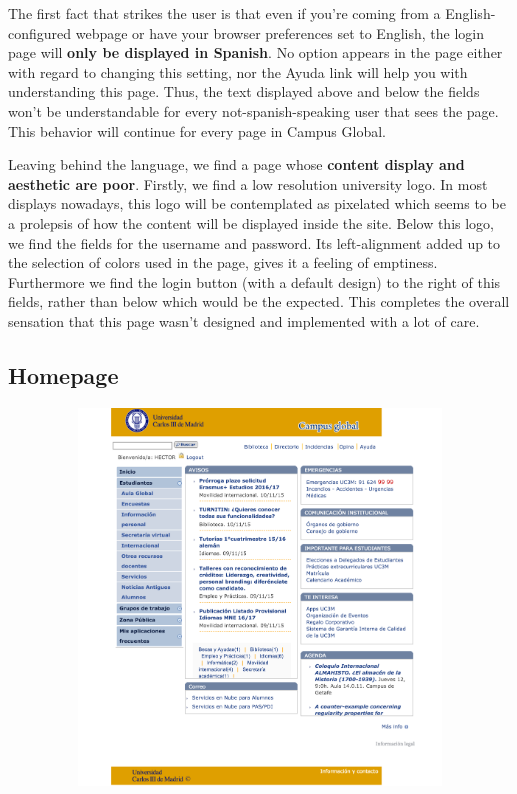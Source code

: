 \documentclass{article}
\begin{document}
The first fact that strikes the user is that even if you’re coming from a English-configured webpage or have your browser preferences set to English, the login page will \textbf{only be displayed in Spanish}. No option appears in the page either with regard to changing this setting, nor the Ayuda link will help you with understanding this page. Thus, the text displayed above and below the fields won’t be understandable for every not-spanish-speaking user that sees the page. This behavior will continue for every page in Campus Global.


Leaving behind the language, we find a page whose \textbf{content display and aesthetic are poor}.
Firstly, we find a low resolution university logo. In most displays nowadays, this logo will be contemplated as pixelated which seems to be a prolepsis of how the content will be displayed inside the site. 
Below this logo, we find the fields for the username and password. Its left-alignment added up to the selection of colors used in the page, gives it a feeling of emptiness. Furthermore we find the login button (with a default design) to the right of this fields, rather than below which would be the expected. This completes the overall sensation that this page wasn't designed and implemented with a lot of care.

\subsection{Homepage}
\vspace{0.3cm}
\begin{center}
\includegraphics[width=15cm, height=10cm, keepaspectratio]{campus}
\end{center}
\end{document}
